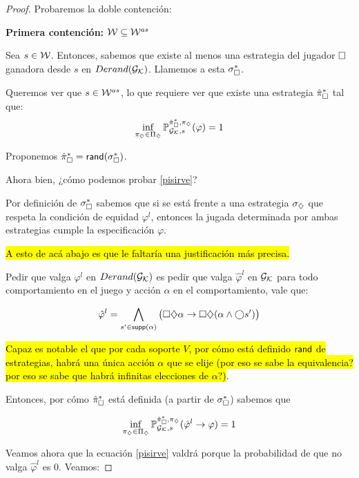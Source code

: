 \begin{proof}
	Probaremos la doble contención:

	\textbf{Primera contención: } $\mathcal{W} \subseteq \mathcal{W}^{as}$

	Sea $s \in \mathcal{W}$. Entonces, sabemos que existe al menos una estrategia del
	jugador $\square$ ganadora desde $s$ en $Derand(\mathcal{G}_{\mathcal{K}})$. Llamemos a esta
	$\sigma_\square^{*}$.

	Queremos ver que $s \in \mathcal{W}^{as}$, lo que requiere ver que existe una estrategia
	$\hat{\pi}_{\square}^{*}$ tal que:
	\begin{equation}
		\label{pisirve}
		\inf_{\pi_\diamondsuit \in \Pi_\diamondsuit} \mathbb{P}_{\mathcal{G}_{\mathcal{K}},s}^{\hat{\pi}_{\square}^{*}, \pi_\diamondsuit}(\varphi) = 1
	\end{equation}

	Proponemos $\hat{\pi}_{\square}^{*} = \textsf{rand}(\sigma_\square^*)$.

	Ahora bien, ¿cómo podemos probar \ref{pisirve}?

	Por definición de $\sigma_\square^*$ sabemos que si se está frente a una
	estrategia $\sigma_\diamondsuit$ que respeta la condición de equidad $\varphi^l$,
	entonces la jugada determinada por ambas estrategias cumple la especificación
	$\varphi$.

	\hl{A esto de acá abajo es que le faltaría una justificación más precisa.}

	Pedir que valga $\varphi^l$ en $Derand(\mathcal{G}_{\mathcal{K}})$ es pedir que valga $\hat{\varphi}^l$ en
	$\mathcal{G}_{\mathcal{K}}$ para todo comportamiento en el juego y acción $\alpha$ en el
	comportamiento, vale que:

	$$
		\hat{\varphi}^l = \bigwedge_{s' \in \textsf{supp}(\alpha)} \left( \square \diamondsuit \alpha \rightarrow \square \diamondsuit (\alpha \wedge \bigcirc s' ) \right)
	$$

	\hl{Capaz es notable el que por cada soporte $V$, por cómo está definido $\textsf{rand}$ de estrategias, habrá una única acción $\alpha$ que se elije (por eso se sabe la equivalencia? por eso se sabe que habrá infinitas elecciones de $\alpha$?)}.

	Entonces, por cómo $\hat{\pi}_{\square}^{*}$ está definida (a partir de $\sigma_\square^*$)
	sabemos que

	\begin{equation}
		\label{implicancia}
		\inf_{\pi_\diamondsuit \in \Pi_\diamondsuit} \mathbb{P}_{\mathcal{G}_{\mathcal{K}},s}^{\hat{\pi}_{\square}^{*}, \pi_\diamondsuit}(\hat{\varphi}^l \rightarrow \varphi) = 1
	\end{equation}

	Veamos ahora que la ecuación \ref{pisirve} valdrá porque la probabilidad de que
	no valga $\hat{\varphi}^l$ es 0. Veamos:


\end{proof}
